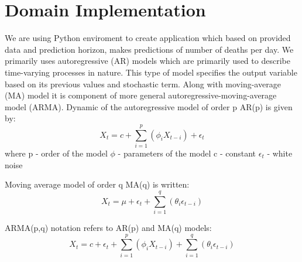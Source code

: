 \documentclass[conference]{IEEEtran}
\begin{document}
\section{Domain Implementation}
We are using Python enviroment to create application which based on provided data and prediction horizon, makes predictions of number of deaths per day.
 We primarily uses autoregressive (AR) models which are primarily used to describe time-varying processes in nature. This type of model specifies the output
  variable based on its previous values and stochastic term. Along with moving-average (MA) model it is component of more general autoregressive-moving-average
  model (ARMA). Dynamic of the autoregressive model of order p AR(p) is given by:
\begin{equation}
    X_t = c + \sum_{i=1}^{p} (\phi_iX_{t-i}) + \epsilon_t
\end{equation}
where
p - order of the model\newline
$ \phi $ - parameters of the model\newline
c - constant\newline
$\epsilon_t$ - white noise\newline


Moving average model of order q MA(q) is written:
\begin{equation}
    X_t = \mu + \epsilon_t + \sum_{i=1}^{q} (\theta_i\epsilon_{t-i})
\end{equation}

ARMA(p,q) notation refers to AR(p) and MA(q) models:
\begin{equation}
    X_t = c + \epsilon_t +\sum_{i=1}^{p} (\phi_iX_{t-i}) + \sum_{i=1}^{q} (\theta_i\epsilon_{t-i})
\end{equation}
\end{document}
